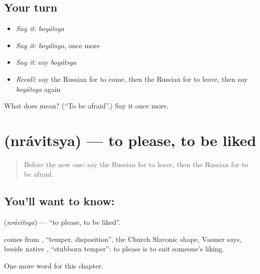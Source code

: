 \subsection*{Your turn}
\begin{itemize}
\raggedright
  \item \emph{Say it:} \emph{boyátsya}
  \item \emph{Say it:} \emph{boyátsya}, once more
  \item \emph{Say it:} say \emph{boyátsya}
  \item \emph{Recall:} say the Russian for to come, then the Russian for to leave, then say \emph{boyátsya} again
\end{itemize}

\begin{tcolorbox}[breakable,colback=teal!4,colframe=teal!35!black,title={Before you move on}]
What does  mean? (\textquotedblleft{}To be afraid\textquotedblright{}.) Say it once more.
\end{tcolorbox}
\section[\texorpdfstring{\ru{нравиться} (nrávitsya)}{нравиться (nrávitsya)}]{ (nrávitsya) — to please, to be liked}

\label{lesson:RU-C144-nravitsya}



\begin{quote}
Before the new one: say the Russian for to leave, then the Russian for to be afraid.
\end{quote}

\subsection*{You'll want to know: }
\textbf{} (\emph{nrávitsya}) — \textquotedblleft{}to please, to be liked\textquotedblright{}.

\begin{cousinweb}
\textbf{} comes from \emph{}, \textquotedblleft{}temper, disposition\textquotedblright{}, the Church Slavonic shape, Vasmer says, beside native \emph{}, \textquotedblleft{}stubborn temper\textquotedblright{}: to please is to suit someone's liking.
\end{cousinweb}

\begin{grammarlens}[title={What you've built}]
One more word for this chapter.
\end{grammarlens}

